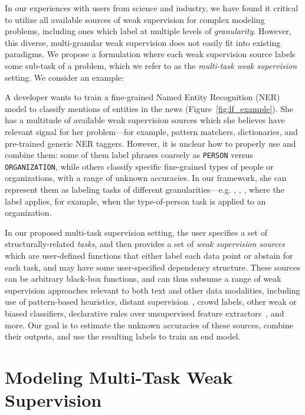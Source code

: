 \documentclass[letterpaper]{article}
\begin{document}
In our experiences with users from science and industry, we have found it critical to utilize all available sources of weak supervision for complex modeling problems, including ones which label at multiple levels of \textit{granularity}.
However, this diverse, multi-granular weak supervision does not easily fit into existing paradigms.
We propose a formulation where each weak supervision source labels some sub-task of a problem, which we refer to as the \textit{multi-task weak supervision} setting.
We consider an example:
\begin{example}
	\label{ex:example-1}
	A developer wants to train a fine-grained Named Entity Recognition (NER) model to classify mentions of entities in the news (Figure~\ref{fig:lf_example}).
	She has a multitude of available weak supervision sources which she believes have relevant signal for her problem---for example, pattern matchers, dictionaries, and pre-trained generic NER taggers.
	However, it is unclear how to properly use and combine them: some of them label phrases coarsely as \texttt{PERSON} versus \texttt{ORGANIZATION}, while others classify specific fine-grained types of people or organizations, with a range of unknown accuracies.
	In our framework, she can represent them as labeling tasks of different granularities---e.g. , , , where the label  applies, for example, when the type-of-person task is applied to an organization.
\end{example}

In our proposed multi-task supervision setting, the user specifies a set of structurally-related \textit{tasks}, and then provides a set of \textit{weak supervision sources} which are user-defined functions that either label each data point or abstain for each task, and may have some user-specified dependency structure.
These sources can be arbitrary black-box functions, and can thus subsume a range of weak supervision approaches relevant to both text and other data modalities, including use of pattern-based heuristics, distant supervision~\cite{mintz2009distant}, crowd labels, other weak or biased classifiers, declarative rules over unsupervised feature extractors~\cite{varma2017inferring}, and more.
Our goal is to estimate the unknown accuracies of these sources, combine their outputs, and use the resulting labels to train an end model. 
\section{Modeling Multi-Task Weak Supervision}
\label{sec:label_model}
\end{document}
